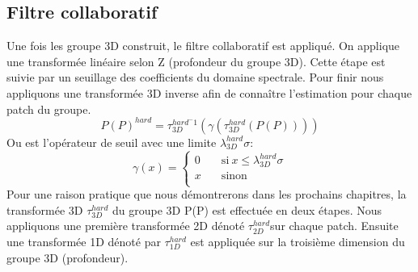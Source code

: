 \subsection{Filtre collaboratif}
Une fois les groupe 3D construit, le filtre collaboratif est appliqué. On applique une transformée linéaire selon Z (profondeur du groupe 3D). Cette étape est suivie par un seuillage des coefficients du domaine spectrale. Pour finir nous appliquons une transformée 3D inverse afin de connaître l'estimation pour chaque patch du groupe. 
\begin{equation}
P(P)^{hard} = \tau^{hard^-1}_{3D} (\gamma (\tau^{hard}_{3D}(P(P))))
\end{equation}
Ou \gamma \: est l'opérateur de seuil avec une limite \(\lambda^{hard}_{3D}\sigma\):
\[ \gamma(x) =
  \begin{cases}
    0       & \quad \text{si} \: x  \leq \lambda^{hard}_{3D}\sigma \\
    x       & \quad \text{sinon}\\
  \end{cases}
\]
Pour une raison pratique que nous démontrerons dans les prochains chapitres, la transformée 3D \(\tau^{hard}_{3D}\) du groupe 3D P(P) est effectuée en deux étapes. Nous appliquons une première transformée 2D dénoté \(\tau^{hard}_{2D}\)sur chaque patch. Ensuite une transformée 1D dénoté par \(\tau^{hard}_{1D}\) est appliquée sur la troisième dimension du groupe 3D (profondeur).  

